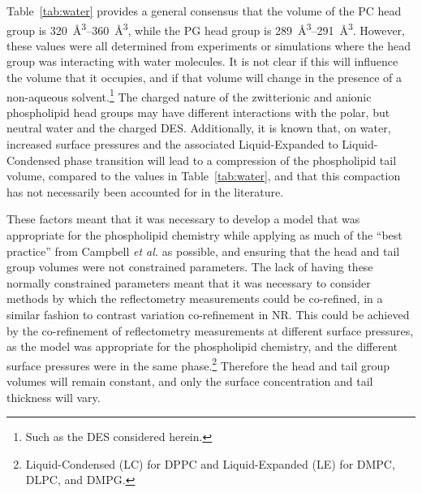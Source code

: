 Table~\ref{tab:water} provides a general consensus that the volume of the PC head group is \SIrange{320}{360}{\angstrom\cubed}, while the PG head group is \SIrange{289}{291}{\angstrom\cubed}.
However, these values were all determined from experiments\autocite{sun_order_1994,kucerka_determination_2004,balgavy_evaluation_2001,pan_molecular_2012} or simulations \autocite{armen_phospholipid_1998,kucerka_scattering_2012} where the head group was interacting with water molecules.
It is not clear if this will influence the volume that it occupies, and if that volume will change in the presence of a non-aqueous solvent.\footnote{Such as the DES considered herein.}
The charged nature of the zwitterionic and anionic phospholipid head groups may have different interactions with the polar, but neutral water and the charged DES.\autocite{sanchez-fernandez_self-assembly_2018}
Additionally, it is known that, on water, increased surface pressures and the associated Liquid-Expanded to Liquid-Condensed phase transition will lead to a compression of the phospholipid tail volume, compared to the values in Table~\ref{tab:water},\autocite{marsh_molecular_2010,small_lateral_1984} and that this compaction has not necessarily been accounted for in the literature.\autocite{campbell_structure_2018}

These factors meant that it was necessary to develop a model that was appropriate for the phospholipid chemistry while applying as much of the ``best practice'' from Campbell \emph{et al.}\autocite{campbell_structure_2018} as possible, and ensuring that the head and tail group volumes were not constrained parameters.
The lack of having these normally constrained parameters meant that it was necessary to consider methods by which the reflectometry measurements could be co-refined, in a similar fashion to contrast variation co-refinement in NR.
This could be achieved by the co-refinement of reflectometry measurements at different surface pressures, as the model was appropriate for the phospholipid chemistry, and the different surface pressures were in the same phase.\footnote{Liquid-Condensed (LC) for DPPC and Liquid-Expanded (LE) for DMPC, DLPC, and DMPG.}
Therefore the head and tail group volumes will remain constant, and only the surface concentration and tail thickness will vary.

